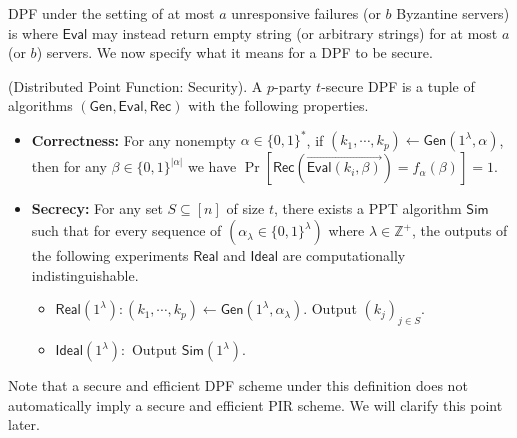 \documentclass[11pt]{article}
\newcommand{\Gen}{\textsf{Gen}}
\newcommand{\Eval}{\textsf{Eval}}
\newcommand{\Rec}{\textsf{Rec}}
\newcommand{\Sim}{\textsf{Sim}}
\newcommand{\Real}{\textsf{Real}}
\newcommand{\Ideal}{\textsf{Ideal}}
\begin{document}
DPF under the setting of at most $a$ unresponsive failures (or $b$ Byzantine servers) is where $\Eval$ may instead return empty string (or arbitrary strings) for at most $a$ (or $b$) servers. We now specify what it means for a DPF to be secure.
\begin{definition}
(Distributed Point Function: Security). A $p$-party $t$-secure DPF is a tuple of algorithms $(\Gen, \Eval, \Rec)$ with the following properties.
\begin{itemize}
\item \textbf{Correctness:} For any nonempty $\alpha \in \{0,1\}^{*}$, if $(k_1, \cdots, k_p) \leftarrow \Gen(1^{\lambda}, \alpha)$, then for any $\beta \in \{0,1\}^{|\alpha|}$ we have $\Pr\left[\Rec\left(\overrightarrow{\Eval(k_i, \beta)}\right) = f_{\alpha}(\beta)\right] = 1$.
\item \textbf{Secrecy:} For any set $S \subseteq [n]$ of size $t$, there exists a PPT algorithm $\Sim$ such that for every sequence of $(\alpha_\lambda \in \{0,1\}^\lambda)$ where $\lambda \in \mathbb{Z}^+$, the outputs of the following experiments $\Real$ and $\Ideal$ are computationally indistinguishable.
\begin{itemize}
  \item $\Real(1^{\lambda}): (k_1, \cdots, k_p) \leftarrow \Gen(1^{\lambda}, \alpha_\lambda)$. Output $(k_j)_{j \in S}$.
  \item $\Ideal(1^{\lambda}):$ Output $\Sim(1^{\lambda})$.
\end{itemize}
\end{itemize}
\end{definition}
Note that a secure and efficient DPF scheme under this definition does not automatically imply a secure and efficient PIR scheme. We will clarify this point later.
\end{document}
